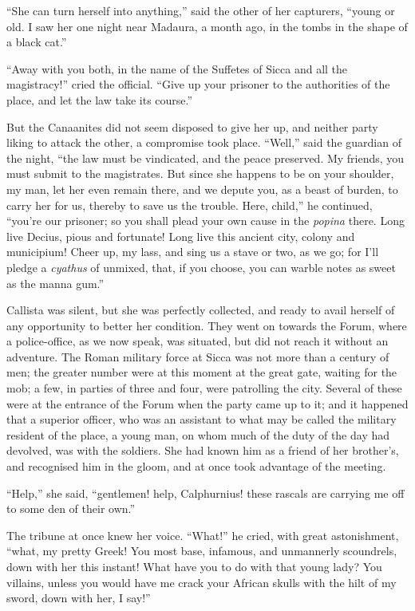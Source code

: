 ``She can turn herself into anything,'' said the other of
her capturers, ``young or old. I saw her one night near Madaura, a
month ago, in the tombs in the shape of a black cat.''

``Away with you both, in the name of the Suffetes of Sicca and
all the magistracy!'' cried the official. ``Give up your
prisoner to the authorities of the place, and let the law take its
course.''

But the Canaanites did not seem disposed to give her up, and
neither party liking to attack the other, a compromise took place.
``Well,'' said the guardian of the night, ``the law must
be vindicated, and the peace preserved. My friends, you must submit to
the magistrates. But since she happens to be on your shoulder, my man,
let her even remain there, and we depute you, as a beast of burden, to
carry her for us, thereby to save us the trouble. Here, child,''
he continued, ``you're our prisoner; so you shall plead your own
cause in the \emph{popina} there. Long live Decius, pious and
fortunate! Long live this ancient city, colony and municipium! Cheer
up, my lass, and sing us a stave or two, as we go; for I'll pledge a \emph{cyathus}
of unmixed, that, if you choose, you can warble notes as sweet as the
manna gum.''

Callista was silent, but she was perfectly collected, and ready to
avail herself of any opportunity to better her condition. They
went on towards the Forum, where a police-office, as we now speak, was
situated, but did not reach it without an adventure. The Roman
military force at Sicca was not more than a century of men; the
greater number were at this moment at the great gate, waiting for the
mob; a few, in parties of three and four, were patrolling the city.
Several of these were at the entrance of the Forum when the party came
up to it; and it happened that a superior officer, who was an
assistant to what may be called the military resident of the place, a
young man, on whom much of the duty of the day had devolved, was with
the soldiers. She had known him as a friend of her brother's, and
recognised him in the gloom, and at once took advantage of the
meeting.

``Help,'' she said, ``gentlemen! help, Calphurnius!
these rascals are carrying me off to some den of their own.''

The tribune at once knew her voice. ``What!'' he cried,
with great astonishment, ``what, my pretty Greek! You most base,
infamous, and unmannerly scoundrels, down with her this instant! What
have you to do with that young lady? You villains, unless you would
have me crack your African skulls with the hilt of my sword, down with
her, I say!''

